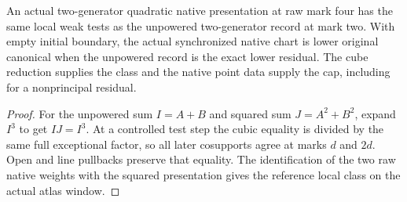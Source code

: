 \begin{theorem}
\label{hir:g8-native-quadratic-square-reduction}
\leanok
An actual two-generator quadratic native presentation at raw
mark four has the same local weak tests as the unpowered
two-generator record at mark two. With empty initial boundary,
the actual synchronized native chart is lower original
canonical when the unpowered record is the exact lower residual.
The cube reduction supplies the class and the native point data
supply the cap, including for a nonprincipal residual.
\end{theorem}
\begin{proof}
For the unpowered sum $I=A+B$ and squared sum $J=A^2+B^2$,
expand $I^3$ to get $IJ=I^3$. At a controlled test step the
cubic equality is divided by the same full exceptional factor,
so all later cosupports agree at marks $d$ and $2d$. Open and
line pullbacks preserve that equality. The identification of
the two raw native weights with the squared presentation gives
the reference local class on the actual atlas window.
\end{proof}

